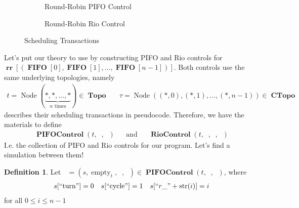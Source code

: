 \documentclass{amsart}
\DeclareMathOperator{\Topo}{\mathbf{Topo}}
\DeclareMathOperator{\Node}{\mathrm{Node}}
\DeclareMathOperator{\RR}{\mathbf{rr}}     %
\DeclareMathOperator{\FIFO}{\mathbf{FIFO}}
\DeclareMathOperator{\CTopo}{\textbf{CTopo}}
\DeclareMathOperator{\PIFOControl}{\mathbf{PIFOControl}}
\DeclareMathOperator{\RioControl}{\mathbf{RioControl}}
\DeclareMathOperator{\zprepush}{z_{\mathrm{pre-push}}}
\DeclareMathOperator{\zpostpop}{z_{\mathrm{post-pop}}}
\DeclareMathOperator{\tzprepush}{z^{\prime}_{\mathrm{pre-push}}}
\DeclareMathOperator{\tzprepop}{z^{\prime}_{\mathrm{pre-pop}}}
\DeclareMathOperator{\tzpostpop}{z^{\prime}_{\mathrm{post-pop}}}
\DeclareMathOperator{\crr}{c_{\text{RR}}}
\DeclareMathOperator{\emt}{\mathrm{empty}}
\theoremstyle{definition}
\newtheorem{dfn}[thm]{Definition}
\begin{document}
\begin{figure}[!htb]
    \centering
    \begin{subfigure}[t]{0.49\linewidth}
        
        
        \caption{Round-Robin PIFO Control}
        \label{fig:rr-pifo-ctrl}
    \end{subfigure}
    \begin{subfigure}[t]{0.49\linewidth}
        
        
        
        \caption{Round-Robin Rio Control}
        \label{fig:rr-rio-ctrl}
    \end{subfigure}
    \caption{Scheduling Transactions}
    \label{fig:sched_trans}
\end{figure}

Let's put our theory to use by constructing PIFO and Rio controls for
$\RR[(\FIFO[0], \FIFO[1], \ldots, \FIFO[n - 1])]$.
Both controls use the same underlying topologies, namely
\begin{align*}
    t = \Node(\underbrace{\ast, \ast, \ldots, \ast}_{n \text{ times}}) \in \Topo
    &&
    \tau = \Node((\ast, 0), (\ast, 1), \ldots, (\ast, n - 1)) \in \CTopo
\end{align*}
 describes their scheduling transactions in pseudocode.
Therefore, we have the materials to define
\begin{align*}
    \PIFOControl(t, \zprepush, \zpostpop)
    &&
    \text{and}
    &&
    \RioControl(t, \tzprepush, \tzprepop, \tzpostpop)
\end{align*}
I.e. the collection of PIFO and Rio controls for our program.
Let's find a simulation between them!

\begin{dfn}
    \label{dfn:rrinit}
    Let $\crr = (s, \emt_t, \zprepush, \zpostpop) \in \PIFOControl(t, \zprepush, \zpostpop)$, where
    \begin{align*}
        s[``\text{turn}"] = 0 &&
        s[``\text{cycle}"] = 1 &&
        s[``r\_" + \text{str}(i)] = i 
    \end{align*}
    for all $0 \leq i \leq n - 1$
\end{dfn}
\end{document}
